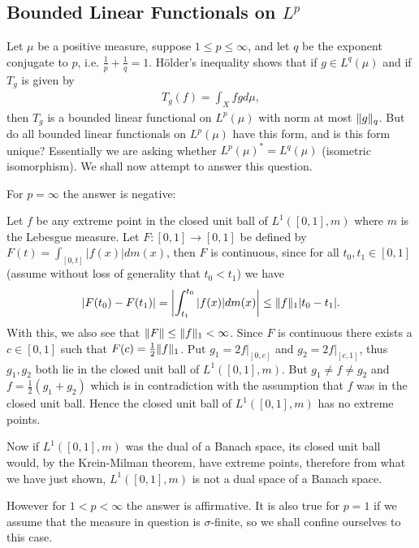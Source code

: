 \subsection{Bounded Linear Functionals on $L^{p}$}
Let $\mu$ be a positive measure, suppose $1\le p \le \infty$, and let $q$ be the exponent conjugate to $p$, i.e. $\frac{1}{p}+\frac{1}{q}=1$. Hölder's inequality shows that if $g\in L^{q}(\mu)$ and if $T_{g}$ is given by
\begin{align*}
	T_{g}(f)=\int_{X}fgd\mu,
\end{align*}
then $T_{g}$ is a bounded linear functional on $L^{p}(\mu)$ with norm at most $\Vert{g}\Vert_{q}$. But do all bounded linear functionals on $L^{p}(\mu)$ have this form, and is this form unique? Essentially we are asking whether $L^{p}(\mu)^{*}=L^{q}(\mu)$ (isometric isomorphism). We shall now attempt to answer this question.

For $p=\infty$ the answer is negative: 

Let $f$ be any extreme point in the closed unit ball of $L^{1}([0,1], m)$ where $m$ is the Lebesgue measure. Let $F:[0,1] \to [0,1]$ be defined by $F(t)=\int_{[0,t]}|f(x)|dm(x)$, then $F$ is continuous, since for all $t_{0},t_{1}\in [0,1]$ (assume without loss of generality that $t_{0}<t_{1}$) we have
\begin{align*}
	|F(t_{0})-F(t_{1})|=\left| \int_{t_{1}}^{t_{0}}|f(x)|dm(x) \right| \le \Vert{f}\Vert_{1}|t_{0}-t_{1}|.
\end{align*}
With this, we also see that $\Vert{F}\Vert\le\Vert{f}\Vert_{1}<\infty$. Since $F$ is continuous there exists a $c\in [0,1]$ such that $F(c)=\frac{1}{2}\Vert{f}\Vert_{1}$. Put $g_{1}=2f|_{[0,c]}$ and $g_{2}=2f|_{[c,1]}$, thus $g_{1},g_{2}$ both lie in the closed unit ball of $L^{1}([0,1],m)$. But $g_{1}\neq f \neq g_{2}$ and $f=\frac{1}{2}(g_{1}+g_{2})$ which is in contradiction with the assumption that $f$ was in the closed unit ball. Hence the closed unit ball of $L^{1}([0,1], m)$ has no extreme points.

Now if $L^{1}([0,1],m)$ was the dual of a Banach space, its closed unit ball would, by the Krein-Milman theorem, have extreme points, therefore from what we have just shown, $L^{1}([0,1], m)$ is not a dual space of a Banach space.

However for $1<p<\infty$ the answer is affirmative. It is also true for $p=1$ if we assume that the measure in question is $\sigma$-finite, so we shall confine ourselves to this case.

